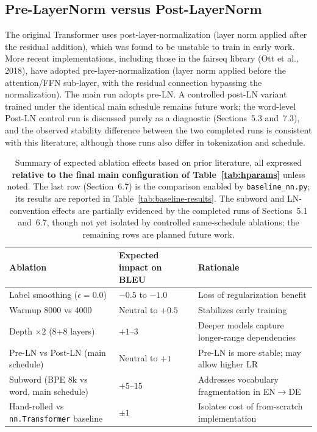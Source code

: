 \documentclass[10pt]{article}
\begin{document}
\subsection{Pre-LayerNorm versus Post-LayerNorm}

The original Transformer uses post-layer-normalization (layer norm applied after the residual addition), which was found to be unstable to train in early work. More recent implementations, including those in the fairseq library (Ott et al., 2018), have adopted pre-layer-normalization (layer norm applied before the attention/FFN sub-layer, with the residual connection bypassing the normalization). The main run adopts pre-LN. A controlled post-LN variant trained under the identical main schedule remains future work; the word-level Post-LN control run is discussed purely as a diagnostic (Sections~5.3 and~7.3), and the observed stability difference between the two completed runs is consistent with this literature, although those runs also differ in tokenization and schedule.

\begin{table}[htbp]
\centering
\small
\setlength{\tabcolsep}{4pt}
\begin{tabularx}{\textwidth}{p{4.7cm} p{3.0cm} X}
\toprule
\textbf{Ablation} & \textbf{Expected impact on BLEU} & \textbf{Rationale} \\
\midrule
Label smoothing ($\epsilon=0.0$) & $-0.5$ to $-1.0$ & Loss of regularization benefit \\
Warmup 8000 vs 4000 & Neutral to $+0.5$ & Stabilizes early training \\
Depth $\times 2$ (8+8 layers) & $+1$--$3$ & Deeper models capture longer-range dependencies \\
Pre-LN vs Post-LN (main schedule) & Neutral to $+1$ & Pre-LN is more stable; may allow higher LR \\
Subword (BPE 8k vs word, main schedule) & $+5$--$15$ & Addresses vocabulary fragmentation in EN$\rightarrow$DE \\
Hand-rolled vs \texttt{nn.Transformer} baseline & $\pm 1$ & Isolates cost of from-scratch implementation \\
\bottomrule
\end{tabularx}
\caption{Summary of expected ablation effects based on prior literature, all expressed \textbf{relative to the final main configuration of Table~\ref{tab:hparams}} unless noted. The last row (Section~6.7) is the comparison enabled by \texttt{baseline\_nn.py}; its results are reported in Table~\ref{tab:baseline-results}. The subword and LN-convention effects are partially evidenced by the completed runs of Sections~5.1 and~6.7, though not yet isolated by controlled same-schedule ablations; the remaining rows are planned future work.}
\label{tab:ablation}
\end{table}
\end{document}
